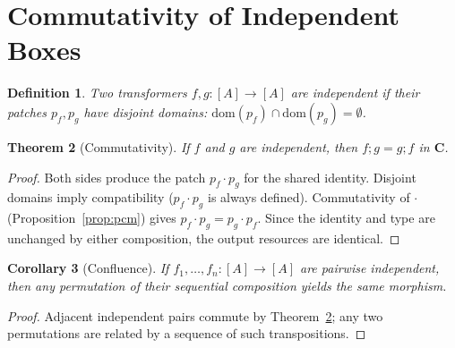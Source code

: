 \documentclass[11pt]{article}
\newtheorem{theorem}{Theorem}[section]
\newtheorem{corollary}[theorem]{Corollary}
\newtheorem{definition}[theorem]{Definition}
\newcommand{\cat}[1]{\mathbf{#1}}
\newcommand{\comp}{\mathbin{;}}
\begin{document}
    \section{Commutativity of Independent Boxes}
    \label{sec:commutativity}

    \begin{definition}
        Two transformers $f, g \colon [A] \to [A]$ are \emph{independent} if their patches
        $p_f, p_g$ have disjoint domains: $\mathrm{dom}(p_f) \cap \mathrm{dom}(p_g) =
        \emptyset$.
    \end{definition}

    \begin{theorem}[Commutativity]\label{thm:commute}
        If $f$ and $g$ are independent, then $f \comp g = g \comp f$ in $\cat{C}$.
    \end{theorem}

    \begin{proof}
        Both sides produce the patch $p_f \cdot p_g$ for the shared identity. Disjoint
        domains imply compatibility ($p_f \cdot p_g$ is always defined). Commutativity of
        $\cdot$ (Proposition~\ref{prop:pcm}) gives $p_f \cdot p_g = p_g \cdot p_f$.
        Since the identity and type are unchanged by either composition, the output
        resources are identical.
    \end{proof}

    \begin{corollary}[Confluence]\label{cor:confluence}
        If $f_1, \ldots, f_n \colon [A] \to [A]$ are pairwise independent, then any
        permutation of their sequential composition yields the same morphism.
    \end{corollary}

    \begin{proof}
        Adjacent independent pairs commute by Theorem~\ref{thm:commute}; any two
        permutations are related by a sequence of such transpositions.
    \end{proof}
\end{document}
